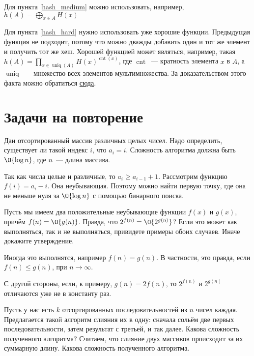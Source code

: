 \documentclass[addpoints]{exam}
\DeclareMathOperator{\uniq}{uniq}
\DeclareMathOperator{\cnt}{cnt}
\begin{document}
\begin{questions}
\begin{solution}
Для пункта \ref{hash_medium} можно использовать, например, $h(A) = \bigoplus\limits_{x \in A} H(x)$

Для пункта \ref{hash_hard} нужно использовать уже хорошие функции. Предыдущая функция не подходит, потому что можно дважды добавить один и тот же элемент и получить тот же хеш. Хорошей функцией может являться, например, такая $h(A) = \prod\limits_{x \in \uniq(A)} H(x)^{\cnt(x)}$, где $\cnt$~--- кратность элемента $x$ в $A$, а $\uniq$~--- множество всех элементов мультимножества. За доказательством этого факта можно обратиться \href{http://link.springer.com/chapter/10.1007%2F978-3-540-40061-5_12}{сюда}.

\end{solution}

\section{Задачи на повторение}

\question[\half] \label{binary_search} Дан отсортированный массив различных целых чисел. Надо определить, существует ли такой индекс $i$, что $a_i = i$. Сложность алгоритма должна быть $\O{\log{n}}$, где $n$~--- длина массива.

\begin{solution}

Так как числа целые и различные, то $a_i \geqslant a_{i - 1} + 1$. Рассмотрим функцию $f(i) = a_i - i$. Она неубывающая. Поэтому можно найти первую точку, где она не меньше нуля за $\O{\log{n}}$ с помощью бинарного поиска.

\end{solution}

\question[\half] Пусть мы имеем два положительные неубывающие функции $f(x)$ и $g(x)$, причём $f(n) = \O{g(n)}$. Правда, что $2^{f(n)} = \O{2^{g(n)}}$? Если это может как выполняться, так и не выполняться, привидете примеры обоих случаев. Иначе докажите утверждение.

\begin{solution}

Иногда это выполнятся, например $f(n) = g(n)$. В частности, это правда, если $f(n) \leqslant g(n)$, при $n \to \infty$.

С другой стороны, если, к примеру, $g(n) = 2f(n)$, то $2^{f(n)}$ и $2^{g(n)}$ отличаются уже не в константу раз.

\end{solution}

\question[\half] Пусть у нас есть $k$ отсортированных последовательностей из $n$ чисел каждая. Предлагается такой алгоритм слияния их в одну: сначала сольём две первых последовательности, затем результат с третьей, и так далее. Какова сложность полученного алгоритма? Считаем, что слияние двух массивов происходит за их суммарную длину. Какова сложность полученного алгоритма.


\end{questions}
\end{document}
